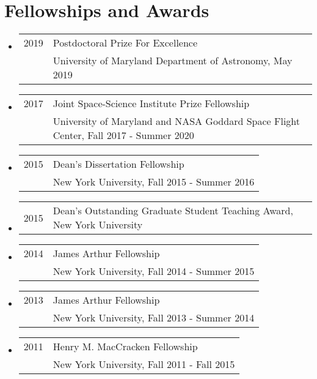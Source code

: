 \section*{Fellowships and Awards}
\begin{itemize}

\item \begin{tabular}{ll}
2019 & Postdoctoral Prize For Excellence \\
& University of Maryland Department of Astronomy, May 2019 \\
\end{tabular}

\item \begin{tabular}{ll}
2017 & Joint Space-Science Institute Prize Fellowship \\
& University of Maryland and NASA Goddard Space Flight Center, Fall 2017 - Summer 2020 \\
\end{tabular}

\item \begin{tabular}{ll}
2015 & Dean's Dissertation Fellowship \\
& New York University, Fall 2015 - Summer 2016 \\
\end{tabular}

\item \begin{tabular}{ll}
2015 & Dean's Outstanding Graduate Student Teaching Award, New York University
\end{tabular}

\item \begin{tabular}{ll}
2014 & James Arthur Fellowship \\
& New York University, Fall 2014 - Summer 2015 \\
\end{tabular}

\item \begin{tabular}{ll}
2013 & James Arthur Fellowship \\
& New York University, Fall 2013 - Summer 2014 \\
\end{tabular}

\item \begin{tabular}{ll}
2011 & Henry M. MacCracken Fellowship \\
& New York University, Fall 2011 - Fall 2015 \\
\end{tabular}


\end{itemize}
